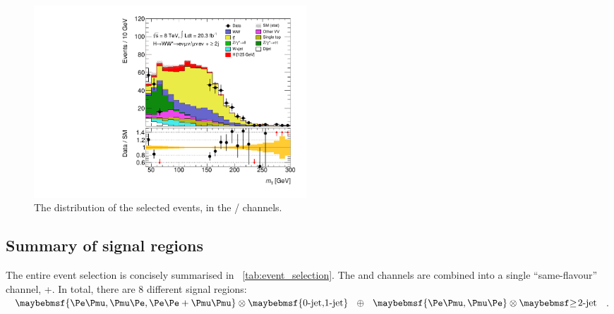 \begin{figure}[t]
	\includegraphics[width=0.495\textwidth]{tex/selection/emme_CutFailVBFTopoDPhillggFlike_2jetincl_MT_TrackHWW_Clj_mh125_lin}
	\caption{The \mt distribution of the selected \twojet events, in the \emch/\mech 
	channels.}
	\label{fig:sel:2j:mt}
\end{figure}



\subsection{Summary of signal regions}
\label{sec:selection:summary}

The entire event selection is concisely summarised in \Table~\ref{tab:event_selection}. The 
\eech and \mmch channels are combined into a single ``same-flavour'' channel, \eech{}+\mmch.
In total, there are 8 different signal regions: $\braces{\emch,\mech,\eech{}+\mmch} 
\otimes \braces{\text{0-jet,1-jet}}~~\oplus~~\braces{\emch,\mech} \otimes \twojet$. 

